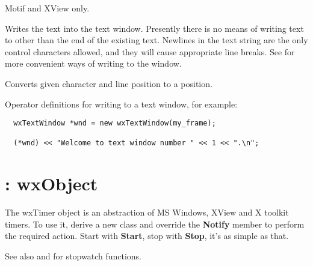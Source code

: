 Motif and XView only.



Writes the text into the text window. Presently there is no means of writing
text to other than the end of the existing text.  Newlines in the text string
are the only control characters allowed, and they will cause appropriate
line breaks.  See  for more convenient ways of writing to the
window.



Converts given character and line position to a position.

\label{textcinsert}







Operator definitions for writing to a text window, for example:

\begin{verbatim}
  wxTextWindow *wnd = new wxTextWindow(my_frame);

  (*wnd) << "Welcome to text window number " << 1 << ".\n";
\end{verbatim}

\section{: wxObject}\label{wxtimer}

The wxTimer object is an abstraction of MS Windows, XView and X toolkit timers. To
use it, derive a new class and override the {\bf Notify} member to
perform the required action. Start with {\bf Start}, stop with {\bf
Stop}, it's as simple as that.

See also  and 
for stopwatch functions.

